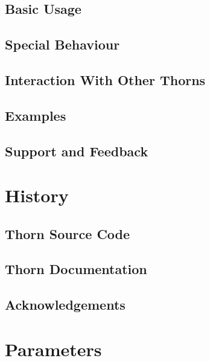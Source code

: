 \subsection{Basic Usage}

\subsection{Special Behaviour}

\subsection{Interaction With Other Thorns}

\subsection{Examples}

\subsection{Support and Feedback}

\section{History}

\subsection{Thorn Source Code}

\subsection{Thorn Documentation}

\subsection{Acknowledgements}


\begin{thebibliography}{9}

\end{thebibliography}




\section{Parameters} 


